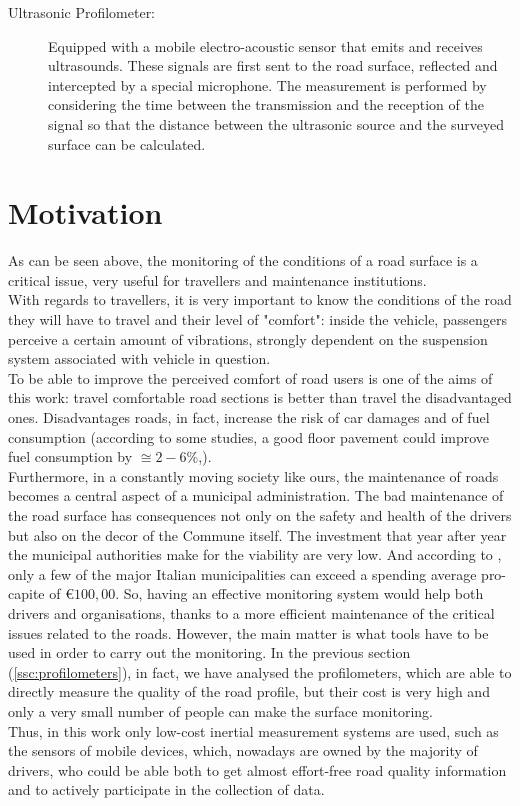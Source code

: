\documentclass[tesi]{subfiles}
\begin{document}
\begin{enumerate}
\begin{description}
\item [Ultrasonic Profilometer:] Equipped with a mobile electro-acoustic sensor that emits and receives ultrasounds. These signals are first sent to the road surface, reflected and intercepted by a special microphone. The measurement is performed by considering the time between the transmission and the reception of the signal so that the distance between the ultrasonic source and the surveyed surface can be calculated\cite{little_book}.
\end{description}

\end{enumerate}
\noindent
	\section{Motivation}\label{sc:Motivation}
\noindent
As can be seen above, the monitoring of the conditions of a road surface is a critical issue, very useful for travellers and maintenance institutions.\\
With regards to travellers, it is very important to know the conditions of the road they will have to travel and their level of "comfort": inside the vehicle, passengers perceive a certain amount of vibrations, strongly dependent on the suspension system associated with vehicle in question.\\
To be able to improve the perceived comfort of road users is one of the aims of this work: travel comfortable road sections is better than travel the disadvantaged ones. Disadvantages roads, in fact, increase the risk of car damages and of fuel consumption (according to some studies, a good floor pavement could improve fuel consumption by $\displaystyle{\cong{2-6\%}}$\cite{jackson2011synthesis},\cite{jointeapa}).\\
Furthermore, in a constantly moving society like ours, the maintenance of roads becomes a central aspect of a municipal administration. The bad maintenance of the road surface has consequences not only on the safety and health of the drivers but also on the decor of the Commune itself. 
The investment that year after year the municipal authorities make for the viability are very low. And according to \cite{piemonte2013finanza}, only a few of the major Italian municipalities can exceed a spending average pro-capite of $\displaystyle{\euro 100,00}$.
So, having an effective monitoring system would help both drivers and organisations, thanks to a more efficient maintenance of the critical issues related to the roads.
However, the main matter is what tools have to be used in order to carry out the monitoring. In the previous section (\ref{ssc:profilometers}), in fact, we have analysed the profilometers, which are able to directly measure the quality of the road profile, but their cost is very high and only a very small number of people can make the surface monitoring. \\Thus, in this work only low-cost inertial measurement systems are used, such as the sensors of mobile devices, which, nowadays are owned by the majority of drivers, who could be able both to get almost effort-free road quality information and to actively participate in the collection of data.
\end{document}
